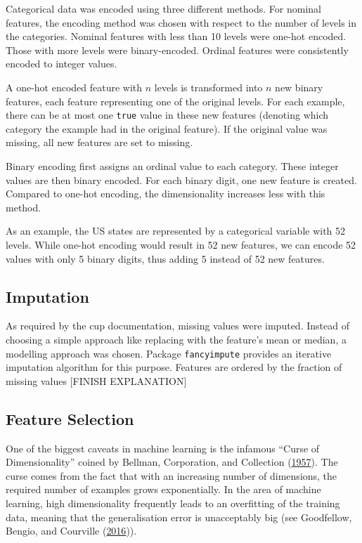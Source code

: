 \documentclass[
  11pt,
  a4paper,
  DIV=12,captions=tableheading,oneside]{scrbook}
\begin{document}
Categorical data was encoded using three different methods. For nominal features, the encoding method was chosen with respect to the number of levels in the categories. Nominal features with less than 10 levels were one-hot encoded. Those with more levels were binary-encoded. Ordinal features were consistently encoded to integer values.

A one-hot encoded feature with \(n\) levels is transformed into \(n\) new binary features, each feature representing one of the original levels. For each example, there can be at most one \texttt{true} value in these new features (denoting which category the example had in the original feature). If the original value was missing, all new features are set to missing.

Binary encoding first assigns an ordinal value to each category. These integer values are then binary encoded. For each binary digit, one new feature is created. Compared to one-hot encoding, the dimensionality increases less with this method.

As an example, the US states are represented by a categorical variable with 52 levels. While one-hot encoding would result in 52 new features, we can encode 52 values with only 5 binary digits, thus adding 5 instead of 52 new features.

\hypertarget{imputation}{%
\subsection{Imputation}\label{imputation}}

As required by the cup documentation, missing values were imputed. Instead of choosing a simple approach like replacing with the feature's mean or median, a modelling approach was chosen. Package \texttt{fancyimpute} provides an iterative imputation algorithm for this purpose. Features are ordered by the fraction of missing values {[}FINISH EXPLANATION{]}

\hypertarget{feature-selection}{%
\subsection{Feature Selection}\label{feature-selection}}

One of the biggest caveats in machine learning is the infamous ``Curse of Dimensionality'' coined by Bellman, Corporation, and Collection (\protect\hyperlink{ref-bellman1957dynamic}{1957}). The curse comes from the fact that with an increasing number of dimensions, the required number of examples grows exponentially. In the area of machine learning, high dimensionality frequently leads to an overfitting of the training data, meaning that the generalisation error is unacceptably big (see Goodfellow, Bengio, and Courville (\protect\hyperlink{ref-Goodfellow-et-al-2016}{2016})).
\end{document}
